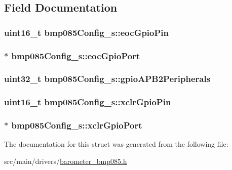 \subsection{Field Documentation}
\hypertarget{structbmp085Config__s_a2dcd6c303bc65eb102fda6324f0374e5}{
\subsubsection[{eoc\+Gpio\+Pin}]{\setlength{\rightskip}{0pt plus 5cm}uint16\+\_\+t bmp085\+Config\+\_\+s\+::eoc\+Gpio\+Pin}}\label{structbmp085Config__s_a2dcd6c303bc65eb102fda6324f0374e5}
\hypertarget{structbmp085Config__s_a80bb9f3de0fa322aa324724284f6a9e5}{
\subsubsection[{eoc\+Gpio\+Port}]{$\ast$ bmp085\+Config\+\_\+s\+::eoc\+Gpio\+Port}}\label{structbmp085Config__s_a80bb9f3de0fa322aa324724284f6a9e5}
\hypertarget{structbmp085Config__s_ab67a02d2556e65f222a2a581c532b186}{
\subsubsection[{gpio\+A\+P\+B2\+Peripherals}]{\setlength{\rightskip}{0pt plus 5cm}uint32\+\_\+t bmp085\+Config\+\_\+s\+::gpio\+A\+P\+B2\+Peripherals}}\label{structbmp085Config__s_ab67a02d2556e65f222a2a581c532b186}
\hypertarget{structbmp085Config__s_a4159d5d72ada0c8c196f0524f76173a9}{
\subsubsection[{xclr\+Gpio\+Pin}]{\setlength{\rightskip}{0pt plus 5cm}uint16\+\_\+t bmp085\+Config\+\_\+s\+::xclr\+Gpio\+Pin}}\label{structbmp085Config__s_a4159d5d72ada0c8c196f0524f76173a9}
\hypertarget{structbmp085Config__s_aa7e5266260ab8a757e59fec2fd73b457}{
\subsubsection[{xclr\+Gpio\+Port}]{$\ast$ bmp085\+Config\+\_\+s\+::xclr\+Gpio\+Port}}\label{structbmp085Config__s_aa7e5266260ab8a757e59fec2fd73b457}


The documentation for this struct was generated from the following file\+:\begin{DoxyCompactItemize}
\item 
src/main/drivers/\hyperlink{barometer__bmp085_8h}{barometer\+\_\+bmp085.\+h}\end{DoxyCompactItemize}
